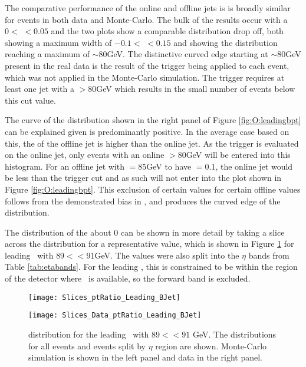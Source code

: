 		\newpage
		The comparative performance of the online and offline jets is \pt is broadly similar for events in both data and Monte-Carlo. The bulk of the results occur with a $0<$ \dptpt$<0.05$ and the two plots show a comparable distribution drop off, both showing a maximum \dptpt width of $-0.1 <$ \dptpt$<0.15$ and showing the \pt distribution reaching a maximum of $\sim80$GeV. The distinctive curved edge starting at \pt$\sim80$GeV present in the real data is the result of the trigger being applied to each event, which was not applied in the Monte-Carlo simulation. The trigger requires at least one jet with a \pt$>80$GeV which results in the small number of events below this cut value.

		The curve of the distribution shown in the right panel of Figure \ref{fig:O:leadingbpt} can be explained given \dptpt is predominantly positive. In the average case based on this, the \pt of the offline jet is higher than the online jet. As the trigger is evaluated on the online jet, only events with an online \pt$>80$GeV will be entered into this histogram. For an offline jet with \pt$=85$GeV to have \dptpt$=0.1$, the online jet would be less than the trigger \pt cut and as such will not enter into the plot shown in Figure \ref{fig:O:leadingbpt}. This exclusion of certain \dptpt values for certain offline \pt values follows from the demonstrated bias in \dptpt, and produces the curved edge of the distribution.

		The distribution of the \dptpt about 0 can be shown in more detail by taking a slice across the distribution for a representative \pt value, which is shown in Figure \ref{fig:O:leadingbptslice} for leading \bjets\ with $89< $\pt$<91$GeV. The \dptpt values were also split into the $\eta$ bands from Table \ref{tab:etabands}. For the leading \bjet, this is constrained to be within the region of the detector where \btag\, is available, so the forward band is excluded.

		\begin{figure}[h]
			\centering

			\begin{minipage}[h]{0.48\linewidth}
				\texttt{[image: Slices\_ptRatio\_Leading\_BJet]}
			\end{minipage}
			\quad
			\begin{minipage}[h]{0.48\linewidth}
				\texttt{[image: Slices\_Data\_ptRatio\_Leading\_BJet]}
			\end{minipage}
			\caption{\dptpt distribution for the leading \bjet\ with $89<$\pt$<91$ GeV. The distributions for all events and events split by $\eta$ region are shown. Monte-Carlo simulation is shown in the left panel and data in the right panel.}
			\label{fig:O:leadingbptslice}
		\end{figure}

